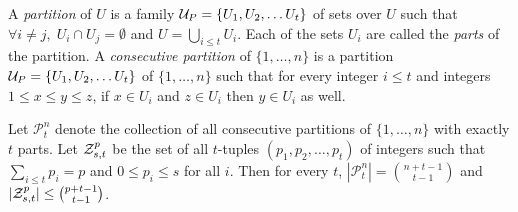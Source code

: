 \begin{definition}
A {\em partition} of $U$ is a family ${\cal U}_P = \{U_1, U_2, \ldots U_t\}$ of sets over $U$ such that $\forall i\neq j,\;U_i \cap U_j = \emptyset$ and $U = \bigcup_{i \leq t} U_i$. 
Each of the sets $U_i$ are called the {\em parts} of the partition. A {\em consecutive partition} of $\{1,\ldots,n\}$ is a partition ${\cal U}_P = \{U_1, U_2, \ldots U_t\}$ of $\{1,\ldots,n\}$ 
such that for every integer $i \leq t$ and integers $1 \leq x \leq y \leq z$, if $x \in U_i$ and $z \in U_i$ then $y \in U_i$ as well. 
\end{definition}
\begin{proposition}
Let $\mathscr{P}_t^{n}$ denote the collection of all consecutive partitions of $\{1,\ldots,n\}$ with exactly $t$ parts. Let 
${\cal Z}_{s,t}^p$ be the set of all $t$-tuples $(p_1,p_2, \ldots, p_t)$ of integers such that $\sum_{i \leq t} p_i = p$ and $0 \leq p_i \leq s$ for all $i$. 
Then for every $t$, $|\mathscr{P}_t^{n}| = {n+t-1 \choose t-1}$ and $|{\cal Z}_{s,t}^p| \leq {p+t-1 \choose t-1}$.
\end{proposition}
